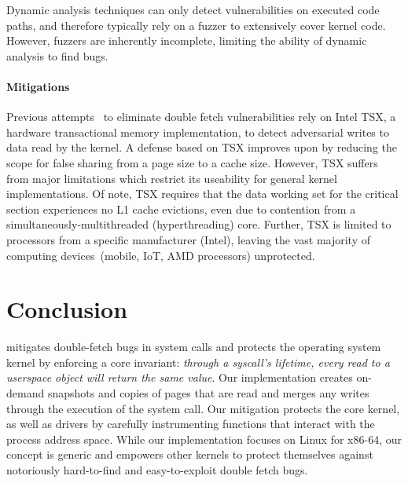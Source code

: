 \documentclass[letterpaper,twocolumn,10pt]{article}
\begin{document}
Dynamic analysis techniques can only detect vulnerabilities on executed code 
paths, and therefore typically rely on a fuzzer to extensively cover kernel code.
However, fuzzers are inherently incomplete, limiting the ability of dynamic 
analysis to find bugs.


\paragraph{Mitigations}
%
Previous attempts~\cite{schwartzDECAF,dftinker} to eliminate double fetch 
vulnerabilities rely on Intel TSX, a hardware transactional 
memory implementation, to detect adversarial writes to data read by the 
kernel. 
A defense based on TSX improves upon \midas by reducing the scope for 
false sharing from a page size to a cache size. 
However, TSX suffers from major limitations which restrict its useability
for general kernel implementations. 
Of note, TSX requires that the data working set for the critical section 
experiences no L1 cache evictions, even due to contention from a 
simultaneously-multithreaded (hyperthreading) core.
Further, TSX is limited to processors from a specific manufacturer (Intel), 
leaving the vast majority
of computing devices~(mobile, IoT, AMD processors) unprotected.

\section{Conclusion}

\midas mitigates double-fetch bugs in system calls and protects the operating
system kernel by enforcing a core invariant:  \emph{through a syscall's
lifetime, every read to a userspace object will return the same value}.
Our \midas implementation creates on-demand snapshots and copies of pages that
are read and merges any writes through the execution of the system call.
%
Our mitigation protects the core kernel, as well as drivers by carefully
instrumenting functions that interact with the process address space. While our
implementation focuses on Linux for x86-64, our concept is generic and empowers
other kernels to protect themselves against notoriously hard-to-find and
easy-to-exploit double fetch bugs.
\end{document}
